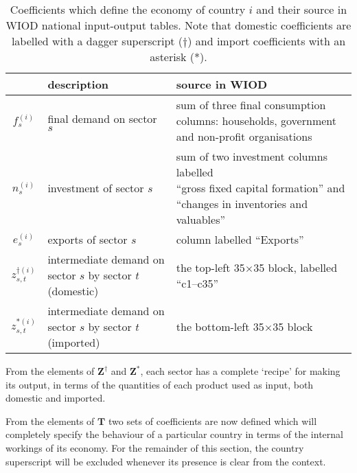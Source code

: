 \documentclass[a4paper]{article}
\begin{document}
\begin{table}
\begin{center}
\begin{tabular}{cp{3.7cm}p{6cm}}
\toprule
	            & description  & source in WIOD \\ \midrule
	$f_s^{(i)}$ & final demand on sector $s$  & 
		\parbox[t]{6cm}{sum of three final consumption columns: households, government and non-profit organisations} \\
	$n_s^{(i)}$ & investment of sector $s$    & 
		\parbox[t]{6cm}{sum of two investment columns labelled\\``gross fixed capital formation'' and \\
						``changes in inventories and valuables''}\\
	$e_s^{(i)}$ & exports of sector $s$       & column labelled ``Exports'' \\
	$z_{s,t}^{\dagger(i)}$ & intermediate demand on 
							sector $s$ by sector $t$ \mbox{(domestic)}& the top-left 35$\times$35 block, labelled ``c1--c35'' \\
	$z_{s,t}^{*(i)}$ & intermediate demand on 
							sector $s$ by sector $t$ \mbox{(imported)}& the bottom-left 35$\times$35 block
\\\bottomrule
\end{tabular}
\caption{Coefficients which define the economy of country $i$ and their source in WIOD national input-output tables. Note that domestic coefficients are labelled with a dagger superscript ($\dagger$) and import coefficients with an asterisk (*).}\label{tbl:cvars}
\end{center}
\end{table}

From the elements of $\boldsymbol{Z}^\dagger$ and $\boldsymbol{Z}^*$, each sector has a complete `recipe' for making its output, in terms of the quantities of each product used as input, both domestic and imported. 

From the elements of $\boldsymbol{T}$ two sets of coefficients are now defined which will completely specify the behaviour of a particular country in terms of the internal workings of its economy. For the remainder of this section, the country superscript will be excluded whenever its presence is clear from the context.
\end{document}
